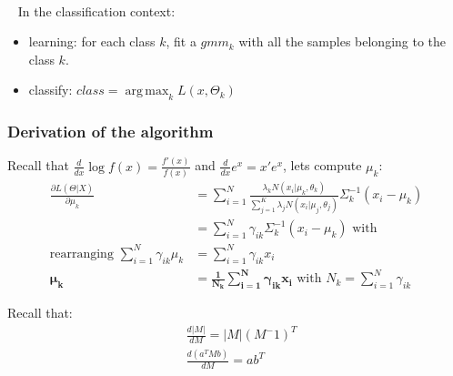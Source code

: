 \documentclass[11pt]{article}
\DeclareMathOperator*{\argmax}{arg\,max}
\begin{document}
~\\~
In the classification context:
\begin{itemize}
\item learning: for each class $k$, fit a $gmm_k$ with all the samples belonging to the class $k$. 
\item classify: $class=\argmax_k L(x,\Theta_k)$
\end{itemize}

\subsubsection{Derivation of the algorithm}
Recall that $\frac{d}{dx} \log f(x) = \frac{f'(x)}{f(x)}$ and $\frac{d}{dx} e ^x=x' e^x$, lets compute $\mu _k$:
\begin{align}
\frac{\partial L(\Theta | X)}{\partial\mu _k} &=  \sum_{i=1}^N \frac{\lambda_k N(x_i| \mu _k, \theta _k)}{\sum _{j=1}^K \lambda _j N(x_i| \mu _j, \theta _j)} \Sigma _k^{-1} (x_i-\mu _k) \nonumber\\
&=  \sum_{i=1}^N \gamma _{ik} \Sigma _k^{-1} (x_i-\mu _k) \text{~with ~} \nonumber\\
\text{rearranging~} \sum_{i=1}^N \gamma _{ik} \mu _ k &= \sum_{i=1}^N \gamma _{ik} x_i \nonumber\\
\bm{\mu _ k} &= \bm{\frac{1}{N_k} \sum_{i=1}^N \gamma _{ik} x_i} \text{~with~} N_k = \sum _{i=1}^N \gamma _{ik}
\end{align}

Recall that:
\begin{align*}
& \frac{d|M|}{dM} = |M|(M^-1)^T \\
& \frac{d(a^TMb)}{dM} = ab^T
\end{align*}
\end{document}

